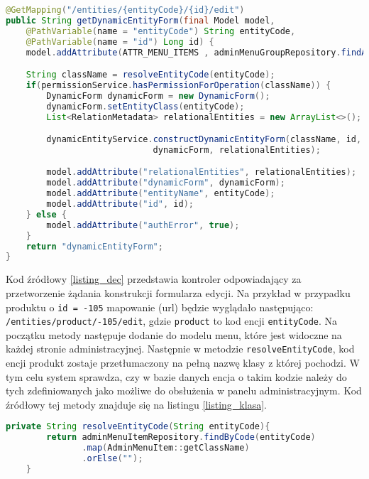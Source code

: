 \begin{small}
\begin{lstlisting}[language=Java, frame=lines, numberstyle=\tiny, stepnumber=5, caption=Przetworzenie zapytania żądania edycji encji \texttt{DynamicEntityController.java}\label{listing_dec}., firstnumber=1]
@GetMapping("/entities/{entityCode}/{id}/edit")
public String getDynamicEntityForm(final Model model, 
    @PathVariable(name = "entityCode") String entityCode,
    @PathVariable(name = "id") Long id) {
    model.addAttribute(ATTR_MENU_ITEMS , adminMenuGroupRepository.findAll());

    String className = resolveEntityCode(entityCode);
    if(permissionService.hasPermissionForOperation(className)) {
        DynamicForm dynamicForm = new DynamicForm();
        dynamicForm.setEntityClass(entityCode);
        List<RelationMetadata> relationalEntities = new ArrayList<>();

        dynamicEntityService.constructDynamicEntityForm(className, id,
                             dynamicForm, relationalEntities);

        model.addAttribute("relationalEntities", relationalEntities);
        model.addAttribute("dynamicForm", dynamicForm);
        model.addAttribute("entityName", entityCode);
        model.addAttribute("id", id);
    } else {
        model.addAttribute("authError", true);
    }
    return "dynamicEntityForm";
}
\end{lstlisting} 
\end{small}

Kod źródłowy \ref{listing_dec} przedstawia kontroler odpowiadający za przetworzenie żądania konstrukcji formularza edycji. Na przykład w przypadku produktu o \texttt{id = -105} mapowanie (url) będzie wyglądało następująco: \texttt{/entities/product/-105/edit}, gdzie \texttt{product} to kod encji \texttt{entityCode}. Na początku metody następuje dodanie do modelu menu, które jest widoczne na każdej stronie administracyjnej. Następnie w metodzie \texttt{resolveEntityCode}, kod encji produkt zostaje przetłumaczony na pełną nazwę klasy z której pochodzi. W tym celu system sprawdza, czy w bazie danych encja o takim kodzie należy do tych zdefiniowanych jako możliwe do obsłużenia w panelu administracyjnym. Kod źródłowy tej metody znajduje się na listingu \ref{listing_klasa}. 
\begin{small}
	\begin{lstlisting}[language=Java, frame=lines, numberstyle=\tiny, stepnumber=5, caption=Zamiana kodu encji na nazwę klasy: \texttt{DynamicEntityController.java}\label{listing_klasa}., firstnumber=1]
	private String resolveEntityCode(String entityCode){
	    return adminMenuItemRepository.findByCode(entityCode)
	           .map(AdminMenuItem::getClassName)
	           .orElse("");
	}
	\end{lstlisting} 
\end{small}

